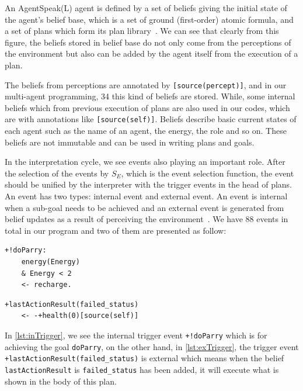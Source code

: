 An AgentSpeak(L) agent is defined by a set of beliefs giving the initial state of the agent's belief base, which is a set of ground (first-order) atomic formula, and a set of plans which form its plan library~\cite{rafael_BDIAgent_2005}.
We can see that clearly from this figure, the beliefs stored in belief base do not only come from the perceptions of the environment but also can be added by the agent itself from the execution of a plan.

The beliefs from perceptions are annotated by \texttt{[source(percept)]}, and in our multi-agent programming, 34 this kind of beliefs are stored.
While, some internal beliefs which from previous execution of plans are also used in our codes, which are with annotations like \texttt{[source(self)]}.
Beliefs describe basic current states of each agent such as the name of an agent, the energy, the role and so on.
These beliefs are not immutable and can be used in writing plans and goals.

In the interpretation cycle, we see events also playing an important role.
After the selection of the events by $S_E$, which is the event selection function, the event should be unified by the interpreter with the trigger events in the head of plans.
An event has two types: internal event and external event.
An event is internal when a sub-goal needs to be achieved and an external event is generated from belief updates as a result of perceiving the environment~\cite{rafael_Javabased_2007}.
We have 88 events in total in our program and two of them are presented as follow:

\begin{lstlisting}[caption={Internal Trigger Event.},label={lst:inTrigger}]
  +!doParry:
    energy(Energy)
    & Energy < 2
    <- recharge.
\end{lstlisting}

\begin{lstlisting}[caption={External Trigger Event.},label={lst:exTrigger}]
  +lastActionResult(failed_status)
    <- -+health(0)[source(self)]
\end{lstlisting}

In \autoref{lst:inTrigger}, we see the internal trigger event \texttt{+!doParry} which is for achieving the goal \texttt{doParry}, on the other hand, in \autoref{lst:exTrigger}, the trigger event \texttt{+lastActionResult(failed\_status)} is external which means when the belief \texttt{ lastActionResult} is \texttt{failed\_status} has been added, it will execute what is shown in the body of this plan.

